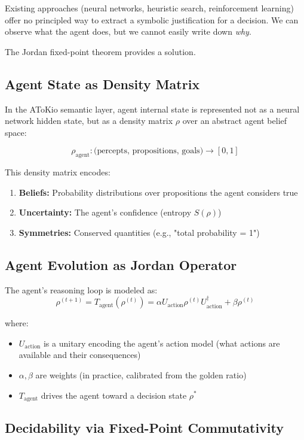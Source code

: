 \documentclass[11pt,a4paper]{article}
\theoremstyle{plain}
\theoremstyle{definition}
\begin{document}
Existing approaches (neural networks, heuristic search, reinforcement learning) offer no principled way to extract a symbolic justification for a decision. We can observe what the agent does, but we cannot easily write down \textit{why}.

The Jordan fixed-point theorem provides a solution.

\subsection{Agent State as Density Matrix}

In the AToKio semantic layer, agent internal state is represented not as a neural network hidden state, but as a density matrix $\rho$ over an abstract agent belief space:

$$\rho_{\text{agent}} : \text{(percepts, propositions, goals)} \to [0,1]$$

This density matrix encodes:
\begin{enumerate}
\item \textbf{Beliefs:} Probability distributions over propositions the agent considers true
\item \textbf{Uncertainty:} The agent's confidence (entropy $S(\rho)$)
\item \textbf{Symmetries:} Conserved quantities (e.g., "total probability = 1")
\end{enumerate}

\subsection{Agent Evolution as Jordan Operator}

The agent's reasoning loop is modeled as:
$$\rho^{(t+1)} = T_{\text{agent}}(\rho^{(t)}) = \alpha U_{\text{action}} \rho^{(t)} U_{\text{action}}^\dagger + \beta \rho^{(t)}$$

where:
\begin{itemize}
\item $U_{\text{action}}$ is a unitary encoding the agent's action model (what actions are available and their consequences)
\item $\alpha, \beta$ are weights (in practice, calibrated from the golden ratio)
\item $T_{\text{agent}}$ drives the agent toward a decision state $\rho^*$
\end{itemize}

\subsection{Decidability via Fixed-Point Commutativity}
\end{document}
